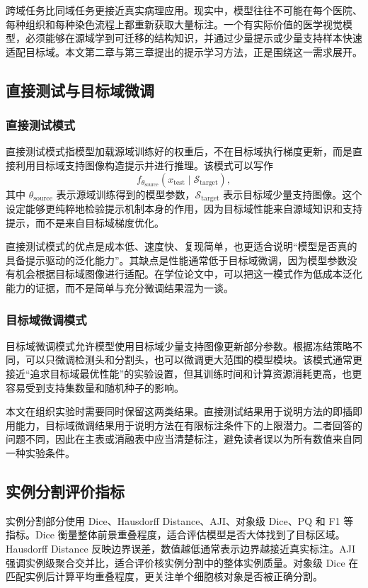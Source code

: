 跨域任务比同域任务更接近真实病理应用。现实中，模型往往不可能在每个医院、每种组织和每种染色流程上都重新获取大量标注。一个有实际价值的医学视觉模型，必须能够在源域学到可迁移的结构知识，并通过少量提示或少量支持样本快速适配目标域。本文第二章与第三章提出的提示学习方法，正是围绕这一需求展开。

\subsection{直接测试与目标域微调}
\subsubsection{直接测试模式}
直接测试模式指模型加载源域训练好的权重后，不在目标域执行梯度更新，而是直接利用目标域支持图像构造提示并进行推理。该模式可以写作
\[
f_{\theta_{\text{source}}}(x_{\text{test}} \mid \mathcal{S}_{\text{target}}),
\]
其中 $\theta_{\text{source}}$ 表示源域训练得到的模型参数，$\mathcal{S}_{\text{target}}$ 表示目标域少量支持图像。这个设定能够更纯粹地检验提示机制本身的作用，因为目标域性能来自源域知识和支持提示，而不是来自目标域梯度优化。

直接测试模式的优点是成本低、速度快、复现简单，也更适合说明“模型是否真的具备提示驱动的泛化能力”。其缺点是性能通常低于目标域微调，因为模型参数没有机会根据目标域图像进行适配。在学位论文中，可以把这一模式作为低成本泛化能力的证据，而不是简单与充分微调结果混为一谈。

\subsubsection{目标域微调模式}
目标域微调模式允许模型使用目标域少量支持图像更新部分参数。根据冻结策略不同，可以只微调检测头和分割头，也可以微调更大范围的模型模块。该模式通常更接近“追求目标域最优性能”的实验设置，但其训练时间和计算资源消耗更高，也更容易受到支持集数量和随机种子的影响。

本文在组织实验时需要同时保留这两类结果。直接测试结果用于说明方法的即插即用能力，目标域微调结果用于说明方法在有限标注条件下的上限潜力。二者回答的问题不同，因此在主表或消融表中应当清楚标注，避免读者误以为所有数值来自同一种实验条件。

\subsection{实例分割评价指标}
实例分割部分使用 Dice、Hausdorff Distance、AJI、对象级 Dice、PQ 和 F1 等指标。Dice 衡量整体前景重叠程度，适合评估模型是否大体找到了目标区域。Hausdorff Distance 反映边界误差，数值越低通常表示边界越接近真实标注。AJI 强调实例级聚合交并比，适合评价核实例分割中的整体实例质量。对象级 Dice 在匹配实例后计算平均重叠程度，更关注单个细胞核对象是否被正确分割。

